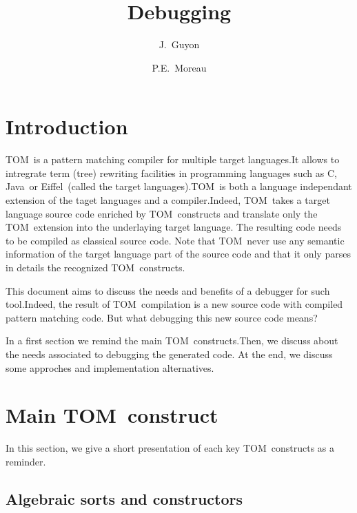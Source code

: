 \documentclass[a4paper]{article}
\author{J.~Guyon \and P.E.~Moreau}
\title{Debugging \TOM}
\newcommand{\TOM}{\textsf{TOM}}
\newcommand{\C}{\textsf{C}}
\newcommand{\Java}{\textsf{Java}}
\newcommand{\Eiffel}{\textsf{Eiffel}}
\begin{document}
\maketitle
\tableofcontents
\newpage

\section{Introduction}
\TOM\ is a pattern matching compiler for multiple target languages.It
allows to intregrate term (tree) rewriting facilities in programming
languages such as \C, \Java\ or \Eiffel\ (called the target
languages).\TOM\ is both a language independant extension of the taget
languages and a
compiler.Indeed, \TOM\ takes a target language source code enriched by \TOM\
constructs and translate only the \TOM\ extension into the underlaying
target language. The resulting code needs to be compiled as classical
source code. Note that \TOM\ never use any semantic information of
the target language part of the source code and that it only parses in
details the recognized \TOM\ constructs.

This document aims to discuss the needs and benefits of a debugger for
such tool.Indeed, the result of \TOM\ compilation is a new source code
with compiled pattern matching code. But what debugging this new source code means?

In a first section we remind the main \TOM\ constructs.Then, we
discuss about the needs associated to debugging the generated code. At
the end, we discuss some approches and implementation alternatives.

\section{Main \TOM\ construct}
In this section, we give a short presentation of each key \TOM\
constructs as a reminder.

\subsection{Algebraic sorts and constructors}
\end{document}
